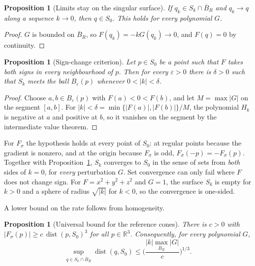 \documentclass[12pt, a4paper, oneside]{book}
\theoremstyle{plain}
\newtheorem{proposition}[theorem]{Proposition}
\theoremstyle{definition}
\theoremstyle{remark}
\begin{document}
\begin{proposition}[Limits stay on the singular surface]
\label{prop:upper-limit}
If $q_k\in S_k\cap\overline{B}_R$ and $q_k\to q$ along a sequence $k\to0$, then
$q\in S_0$. This holds for every polynomial $G$.
\end{proposition}

\begin{proof}
$G$ is bounded on $\overline{B}_R$, so $F(q_k)=-kG(q_k)\to0$, and $F(q)=0$ by
continuity.
\end{proof}

\begin{proposition}[Sign-change criterion]
\label{prop:sign-change}
Let $p\in S_0$ be a point such that $F$ takes both signs in every
neighbourhood of $p$. Then for every $\varepsilon>0$ there is $\delta>0$ such
that $S_k$ meets the ball $B_\varepsilon(p)$ whenever $0<|k|<\delta$.
\end{proposition}

\begin{proof}
Choose $a,b\in B_\varepsilon(p)$ with $F(a)<0<F(b)$, and let
$M=\max|G|$ on the segment $[a,b]$. For
$|k|<\delta=\min\{|F(a)|,|F(b)|\}/M$, the polynomial $H_k$ is negative at $a$
and positive at $b$, so it vanishes on the segment by the intermediate value
theorem.
\end{proof}

For $F_\sigma$ the hypothesis holds at every point of $S_0$: at regular points
because the gradient is nonzero, and at the origin because $F_\sigma$ is odd,
$F_\sigma(-p)=-F_\sigma(p)$. Together with Proposition~\ref{prop:upper-limit},
$S_k$ converges to $S_0$ in the sense of sets from \emph{both} sides of $k=0$,
for \emph{every} perturbation $G$. Set convergence can only fail where $F$ does
not change sign. For $F=x^2+y^2+z^2$ and $G=1$, the surface $S_k$ is empty for
$k>0$ and a sphere of radius $\sqrt{|k|}$ for $k<0$, so the convergence is
one-sided.

A lower bound on the rate follows from homogeneity.

\begin{proposition}[Universal bound for the reference cones]
\label{prop:lojasiewicz}
There is $c>0$ with $|F_\sigma(p)|\ge c\,\operatorname{dist}(p,S_0)^3$ for all
$p\in\mathbb{R}^3$. Consequently, for every polynomial $G$,
\[
\sup_{q\in S_k\cap\overline{B}_R}\operatorname{dist}(q,S_0)
\le\Big(\frac{|k|\max_{\overline{B}_R}|G|}{c}\Big)^{1/3}.
\]
\end{proposition}
\end{document}

